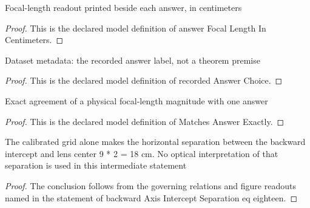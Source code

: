 \begin{definition}
  \label{def:physics:phyx-mini-0109:phyxminiproblems-problemphyxmini0109-answerfocallengthincentimeters}
  Focal-length readout printed beside each answer, in centimeters
\end{definition}
\begin{proof}
  This is the declared model definition of answer Focal Length In Centimeters.
\end{proof}
\begin{definition}
  \label{def:physics:phyx-mini-0109:phyxminiproblems-problemphyxmini0109-recordedanswerchoice}
  Dataset metadata: the recorded answer label, not a theorem premise
\end{definition}
\begin{proof}
  This is the declared model definition of recorded Answer Choice.
\end{proof}
\begin{definition}
  \label{def:physics:phyx-mini-0109:phyxminiproblems-problemphyxmini0109-matchesanswerexactly}
  Exact agreement of a physical focal-length magnitude with one answer
\end{definition}
\begin{proof}
  This is the declared model definition of Matches Answer Exactly.
\end{proof}
\begin{lemma}
  \label{lem:physics:phyx-mini-0109:phyxminiproblems-problemphyxmini0109-backwardaxisinterceptseparation-eq-eighteen}
  The calibrated grid alone makes the horizontal separation between the backward intercept and lens center 9 * 2 = 18 cm. No optical interpretation of that separation is used in this intermediate statement
\end{lemma}
\begin{proof}
  The conclusion follows from the governing relations and figure readouts named in the statement of backward Axis Intercept Separation eq eighteen.
\end{proof}
